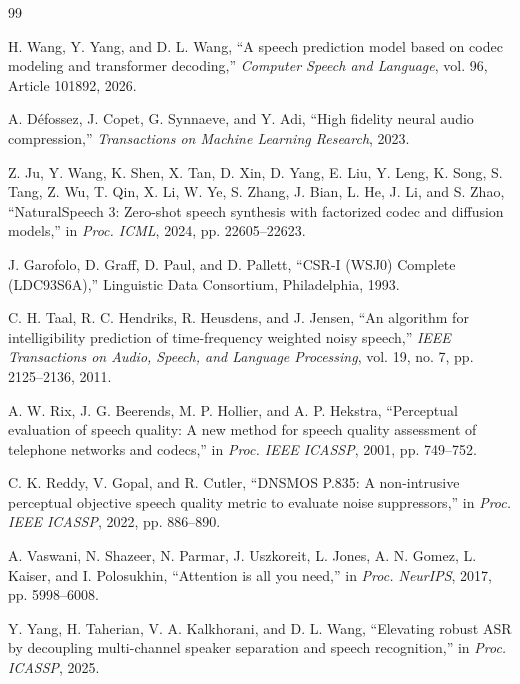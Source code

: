 \documentclass{article}
\begin{document}
	\begin{thebibliography}{99}
		
		H. Wang, Y. Yang, and D. L. Wang, ``A speech prediction model based on codec modeling and transformer decoding,'' \emph{Computer Speech and Language}, vol. 96, Article 101892, 2026.
		
		A. D\'efossez, J. Copet, G. Synnaeve, and Y. Adi, ``High fidelity neural audio compression,'' \emph{Transactions on Machine Learning Research}, 2023.
		
		Z. Ju, Y. Wang, K. Shen, X. Tan, D. Xin, D. Yang, E. Liu, Y. Leng, K. Song, S. Tang, Z. Wu, T. Qin, X. Li, W. Ye, S. Zhang, J. Bian, L. He, J. Li, and S. Zhao, ``NaturalSpeech 3: Zero-shot speech synthesis with factorized codec and diffusion models,'' in \emph{Proc. ICML}, 2024, pp. 22605--22623.
		
		J. Garofolo, D. Graff, D. Paul, and D. Pallett, ``CSR-I (WSJ0) Complete (LDC93S6A),'' Linguistic Data Consortium, Philadelphia, 1993.
		
		C. H. Taal, R. C. Hendriks, R. Heusdens, and J. Jensen, ``An algorithm for intelligibility prediction of time-frequency weighted noisy speech,'' \emph{IEEE Transactions on Audio, Speech, and Language Processing}, vol. 19, no. 7, pp. 2125--2136, 2011.
		
		A. W. Rix, J. G. Beerends, M. P. Hollier, and A. P. Hekstra, ``Perceptual evaluation of speech quality: A new method for speech quality assessment of telephone networks and codecs,'' in \emph{Proc. IEEE ICASSP}, 2001, pp. 749--752.
		
		C. K. Reddy, V. Gopal, and R. Cutler, ``DNSMOS P.835: A non-intrusive perceptual objective speech quality metric to evaluate noise suppressors,'' in \emph{Proc. IEEE ICASSP}, 2022, pp. 886--890.
		
		A. Vaswani, N. Shazeer, N. Parmar, J. Uszkoreit, L. Jones, A. N. Gomez, L. Kaiser, and I. Polosukhin, ``Attention is all you need,'' in \emph{Proc. NeurIPS}, 2017, pp. 5998--6008.
		
		Y. Yang, H. Taherian, V. A. Kalkhorani, and D. L. Wang, ``Elevating robust ASR by decoupling multi-channel speaker separation and speech recognition,'' in \emph{Proc. ICASSP}, 2025.
		
	\end{thebibliography}
	
\end{document}
